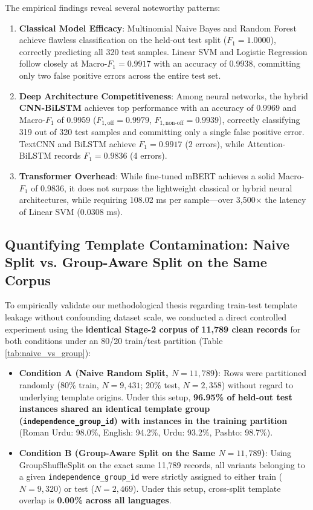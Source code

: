 \documentclass[11pt,a4paper]{article}
\begin{document}
The empirical findings reveal several noteworthy patterns:
\begin{enumerate}
    \item \textbf{Classical Model Efficacy}: Multinomial Naive Bayes and Random Forest achieve flawless classification on the held-out test split ($F_1 = 1.0000$), correctly predicting all 320 test samples. Linear SVM and Logistic Regression follow closely at Macro-$F_1 = 0.9917$ with an accuracy of 0.9938, committing only two false positive errors across the entire test set.
    \item \textbf{Deep Architecture Competitiveness}: Among neural networks, the hybrid \textbf{CNN-BiLSTM} achieves top performance with an accuracy of 0.9969 and Macro-$F_1$ of 0.9959 ($F_{1, \text{off}} = 0.9979$, $F_{1, \text{non-off}} = 0.9939$), correctly classifying 319 out of 320 test samples and committing only a single false positive error. TextCNN and BiLSTM achieve $F_1 = 0.9917$ (2 errors), while Attention-BiLSTM records $F_1 = 0.9836$ (4 errors).
    \item \textbf{Transformer Overhead}: While fine-tuned mBERT achieves a solid Macro-$F_1$ of 0.9836, it does not surpass the lightweight classical or hybrid neural architectures, while requiring 108.02 ms per sample---over 3,500$\times$ the latency of Linear SVM (0.0308 ms).
\end{enumerate}

\subsection{Quantifying Template Contamination: Naive Split vs. Group-Aware Split on the Same Corpus}\label{sec:naive_vs_group}
To empirically validate our methodological thesis regarding train-test template leakage without confounding dataset scale, we conducted a direct controlled experiment using the \textbf{identical Stage-2 corpus of 11,789 clean records} for both conditions under an 80/20 train/test partition (Table \ref{tab:naive_vs_group}):
\begin{itemize}
    \item \textbf{Condition A (Naive Random Split, $N = 11,789$)}: Rows were partitioned randomly (80\% train, $N = 9,431$; 20\% test, $N = 2,358$) without regard to underlying template origins. Under this setup, \textbf{96.95\% of held-out test instances shared an identical template group (\texttt{independence\_group\_id}) with instances in the training partition} (Roman Urdu: 98.0\%, English: 94.2\%, Urdu: 93.2\%, Pashto: 98.7\%).
    \item \textbf{Condition B (Group-Aware Split on the Same $N = 11,789$)}: Using GroupShuffleSplit on the exact same 11,789 records, all variants belonging to a given \texttt{independence\_group\_id} were strictly assigned to either train ($N = 9,320$) or test ($N = 2,469$). Under this setup, cross-split template overlap is \textbf{0.00\% across all languages}.
\end{itemize}
\end{document}
